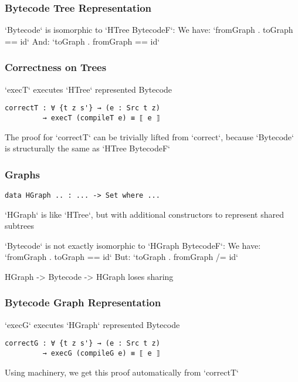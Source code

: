         \begin{frame}[fragile]
            \frametitle{Bytecode Tree Representation}
            `Bytecode` is isomorphic to `HTree BytecodeF`:
            We have: `fromGraph . toGraph == id`
            And:     `toGraph . fromGraph == id`
\end{frame}
                
        \begin{frame}[fragile]
            \frametitle{Correctness on Trees}
            `execT` executes `HTree` represented Bytecode
            \begin{verbatim}
correctT : ∀ {t z s'} → (e : Src t z) 
         → execT (compileT e) ≡ ⟦ e ⟧
            \end{verbatim}
            The proof for `correctT` can be trivially lifted from `correct`,
            because `Bytecode` is structurally the same as `HTree BytecodeF`
\end{frame}

        \begin{frame}[fragile]
            \frametitle{Graphs}
            \begin{verbatim}
data HGraph .. : ... -> Set where ...
            \end{verbatim}
            
            `HGraph` is like `HTree`, but with additional constructors to represent shared subtrees
            
            `Bytecode` is not exactly isomorphic to `HGraph BytecodeF`:
            We have: `fromGraph . toGraph == id`
            But:     `toGraph . fromGraph /= id`
            
            HGraph -> Bytecode -> HGraph loses sharing
\end{frame}
         
         \begin{frame}[fragile]
            \frametitle{Bytecode Graph Representation}
            `execG` executes `HGraph` represented Bytecode
            \begin{verbatim}
correctG : ∀ {t z s'} → (e : Src t z) 
         → execG (compileG e) ≡ ⟦ e ⟧
            \end{verbatim}
            
            Using machinery, we get this proof automatically from `correctT`
\end{frame}

